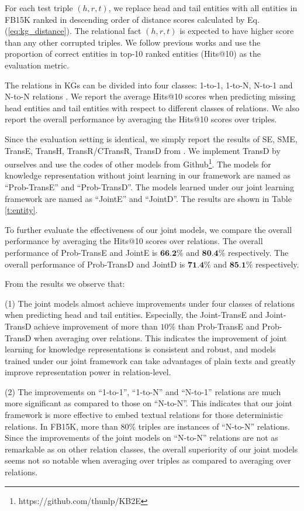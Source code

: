 \documentclass[letterpaper]{article} %
\begin{document}
For each test triple $(h, r, t)$, we replace head and tail entities with all entities in FB15K ranked in descending order of distance scores calculated by Eq. (\ref{eq:kg_distance}). The relational fact $(h, r, t)$ is expected to have higher score than any other corrupted triples. We follow previous works and use the proportion of correct entities in top-10 ranked entities (Hits@10) as the evaluation metric. 

The relations in KGs can be divided into four classes: 1-to-1, 1-to-N, N-to-1 and N-to-N relations \cite{bordes2013translating}. We report the average Hits@10 scores when predicting missing head entities and tail entities with respect to different classes of relations. We also report the overall performance by averaging the Hits@10 scores over triples. 

Since the evaluation setting is identical, we simply report the results of SE, SME, TransE, TransH, TransR/CTransR, TransD from \cite{bordes2011learning,bordes2012joint,bordes2013translating,wang2014transh,lin2015learning,ji2015knowledge}. We implement TransD by ourselves and use the codes of other models from Github\footnote{https://github.com/thunlp/KB2E}. The models for knowledge representation without joint learning in our framework are named as ``Prob-TransE'' and ``Prob-TransD''. The models learned under our joint learning framework are named as ``JointE'' and ``JointD''. The results are shown in Table \ref{t:entity}. 

To further evaluate the effectiveness of our joint models, we compare the overall performance by averaging the Hits@10 scores over relations. The overall performance of Prob-TransE and JointE is $\textbf{66.2\%}$ and $\textbf{80.4\%}$ respectively. The overall performance of Prob-TransD and JointD is $\textbf{71.4\%}$ and $\textbf{85.1\%}$ respectively. 

From the results we observe that: 

(1) The joint models almost achieve improvements under four classes of relations when predicting head and tail entities. Especially, the Joint-TransE and Joint-TransD achieve improvement of more than $10\%$ than Prob-TransE and Prob-TransD when averaging over relations. This indicates the improvement of joint learning for knowledge representations is consistent and robust, and models trained under our joint framework can take advantages of plain texts and greatly improve representation power in relation-level. 

(2) The improvements on ``1-to-1'', ``1-to-N'' and ``N-to-1'' relations are much more significant as compared to those on ``N-to-N''. This indicates that our joint framework is more effective to embed textual relations for those deterministic relations. In FB15K, more than $80\%$ triples are instances of ``N-to-N'' relations. Since the improvements of the joint models on ``N-to-N'' relations are not as remarkable as on other relation classes, the overall superiority of our joint models seems not so notable when averaging over triples as compared to averaging over relations. 
\end{document}
